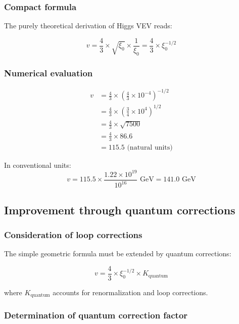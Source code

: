 \documentclass[12pt,a4paper]{report}
\begin{document}
\subsubsection{Compact formula}

The purely theoretical derivation of Higgs VEV reads:

\begin{equation}
	\boxed{v = \frac{4}{3} \times \sqrt{\xi_0} \times \frac{1}{\xi_0} = \frac{4}{3} \times \xi_0^{-1/2}}
\end{equation}

\subsubsection{Numerical evaluation}

\begin{align}
	v &= \frac{4}{3} \times \left(\frac{4}{3} \times 10^{-4}\right)^{-1/2}\\
	&= \frac{4}{3} \times \left(\frac{3}{4} \times 10^{4}\right)^{1/2}\\
	&= \frac{4}{3} \times \sqrt{7500}\\
	&= \frac{4}{3} \times 86.6\\
	&= 115.5 \text{ (natural units)}
\end{align}

In conventional units:
\begin{equation}
	v = 115.5 \times \frac{1.22 \times 10^{19}}{10^{16}} \text{ GeV} = 141.0 \text{ GeV}
\end{equation}

\subsection{Improvement through quantum corrections}

\subsubsection{Consideration of loop corrections}

The simple geometric formula must be extended by quantum corrections:

\begin{equation}
	v = \frac{4}{3} \times \xi_0^{-1/2} \times K_{\text{quantum}}
\end{equation}

where $K_{\text{quantum}}$ accounts for renormalization and loop corrections.

\subsubsection{Determination of quantum correction factor}
\end{document}
